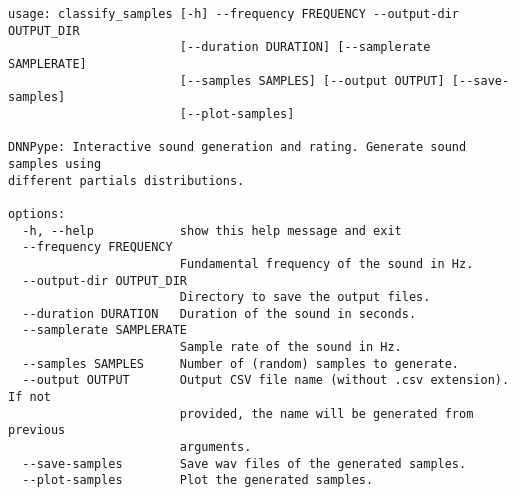 \begin{code}
\label{code:classify}
\begin{verbatim}
usage: classify_samples [-h] --frequency FREQUENCY --output-dir OUTPUT_DIR
                        [--duration DURATION] [--samplerate SAMPLERATE]
                        [--samples SAMPLES] [--output OUTPUT] [--save-samples]
                        [--plot-samples]

DNNPype: Interactive sound generation and rating. Generate sound samples using
different partials distributions.

options:
  -h, --help            show this help message and exit
  --frequency FREQUENCY
                        Fundamental frequency of the sound in Hz.
  --output-dir OUTPUT_DIR
                        Directory to save the output files.
  --duration DURATION   Duration of the sound in seconds.
  --samplerate SAMPLERATE
                        Sample rate of the sound in Hz.
  --samples SAMPLES     Number of (random) samples to generate.
  --output OUTPUT       Output CSV file name (without .csv extension). If not
                        provided, the name will be generated from previous
                        arguments.
  --save-samples        Save wav files of the generated samples.
  --plot-samples        Plot the generated samples.
\end{verbatim}
\end{code}
